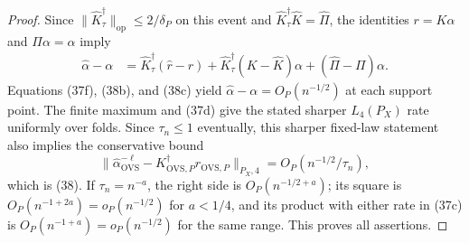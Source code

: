 \documentclass{article}
\begin{document}
\begin{proof}
Since \(\|\widehat K_\tau^\dagger\|_{\mathrm{op}}\le2/\delta_P\) on this event and \(\widehat K_\tau^\dagger\widehat K=\widehat\Pi\), the identities \(r=K\alpha\) and \(\Pi\alpha=\alpha\) imply
\[
\begin{aligned}
\widehat\alpha-\alpha
&=\widehat K_\tau^\dagger(\widehat r-r)
+\widehat K_\tau^\dagger(K-\widehat K)\alpha
+(\widehat\Pi-\Pi)\alpha.
\end{aligned}
\tag{38c}
\]
Equations (37f), (38b), and (38c) yield \(\widehat\alpha-\alpha=O_P(n^{-1/2})\) at each support point.  The finite maximum and (37d) give the stated sharper \(L_4(P_X)\) rate uniformly over folds.  Since \(\tau_n\le1\) eventually, this sharper fixed-law statement also implies the conservative bound
\[
\|\widehat\alpha_{\mathrm{OVS}}^{-\ell}
-K_{\mathrm{OVS},P}^\dagger r_{\mathrm{OVS},P}\|_{P_X,4}
=O_P(n^{-1/2}/\tau_n),
\]
which is (38).  If \(\tau_n=n^{-a}\), the right side is \(O_P(n^{-1/2+a})\); its square is \(O_P(n^{-1+2a})=o_P(n^{-1/2})\) for \(a<1/4\), and its product with either rate in (37c) is \(O_P(n^{-1+a})=o_P(n^{-1/2})\) for the same range.  This proves all assertions.
\end{proof}
\end{document}
